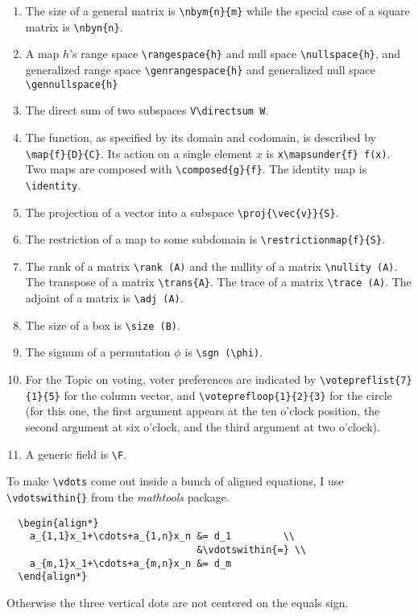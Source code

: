 \documentclass[titlepage]{article}
\begin{document}
\begin{description}
\begin{enumerate}
    \item The size of a general matrix is \verb|\nbym{n}{m}| 
      while the special case of a square matrix is \verb|\nbyn{n}|.
    \item A map $h$'s range space \verb|\rangespace{h}| 
      and null space \verb|\nullspace{h}|, 
      and generalized range space \verb|\genrangespace{h}|
      and generalized null space \verb|\gennullspace{h}|
    \item The direct sum of two subspaces \verb|V\directsum W|.
    \item The function, as specified by its domain and codomain,
      is described by \verb!\map{f}{D}{C}!.
      Its action on a single element $x$ is 
      \verb|x\mapsunder{f} f(x)|.
      Two maps are composed with \verb!\composed{g}{f}!.
      The identity map is \verb|\identity|.       
    \item The projection of a vector into a subspace
      \verb|\proj{\vec{v}}{S}|. 
    \item The restriction of a map to some subdomain is
      \verb!\restrictionmap{f}{S}!.
    \item The rank of a matrix \verb|\rank (A)| and the nullity  of a
      matrix \verb|\nullity (A)|. 
      The transpose of a matrix \verb|\trans{A}|.
      The trace of a matrix \verb|\trace (A)|.
      The adjoint of a matrix is \verb|\adj (A)|.
    \item The size of a box is \verb!\size (B)!.
    \item The signum of a permutation $\phi$ is \verb|\sgn (\phi)|.
    \item For the Topic on voting, voter preferences are indicated
      by \verb|\votepreflist{7}{1}{5}| for the column vector,
      and \verb|\voteprefloop{1}{2}{3}| for the circle (for this one,
      the first argument appears at the ten o'clock position, the second
      argument at six o'clock, and the third argument at two o'clock).
    \item A generic field is \verb!\F!.
  \end{enumerate}


\item[aligned vdots]
  To make \verb!\vdots! come out inside a bunch of aligned equations,
  I use \verb!\vdotswithin{}! from the \textit{mathtools} package.
\begin{verbatim}
  \begin{align*}
    a_{1,1}x_1+\cdots+a_{1,n}x_n &= d_1         \\
                                 &\vdotswithin{=} \\
    a_{m,1}x_1+\cdots+a_{m,n}x_n &= d_m         
  \end{align*}
\end{verbatim}
  Otherwise the three vertical dots are not centered on the equals sign.


\end{description}
\end{document}
